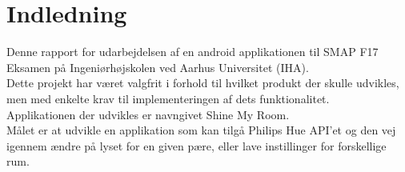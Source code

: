 \chapter{Indledning}
Denne rapport for udarbejdelsen af en android applikationen til SMAP F17 Eksamen på Ingeniørhøjskolen
ved Aarhus Universitet (IHA).\\
Dette projekt har været valgfrit i forhold til hvilket produkt der skulle udvikles, men med
enkelte krav til implementeringen af dets funktionalitet.\\
Applikationen der udvikles er navngivet Shine My Room.\\
\newline
Målet er at udvikle en applikation som kan tilgå Philips Hue API'et og den vej igennem ændre på lyset for en given pære, eller lave instillinger for forskellige rum. 
\newline